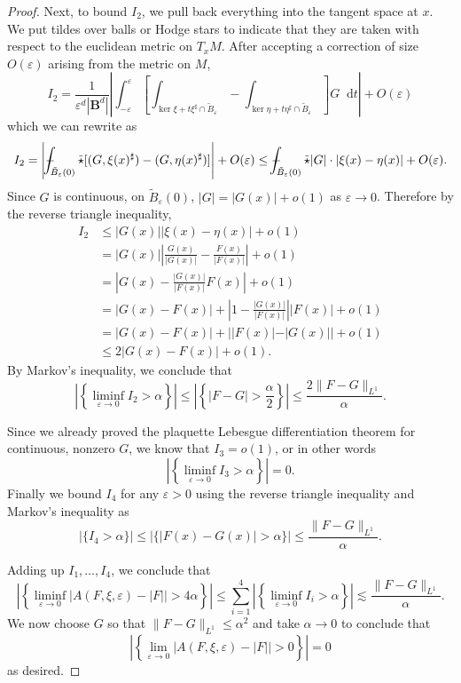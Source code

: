 \documentclass[reqno,11pt]{amsart}
\newcommand{\Ball}{\mathbf{B}}
\newcommand*\dif{\mathop{}\!\mathrm{d}}
\theoremstyle{definition}
\numberwithin{equation}{section}
\def\Xint#1{\mathchoice
{\XXint\displaystyle\textstyle{#1}}%
{\XXint\textstyle\scriptstyle{#1}}%
{\XXint\scriptstyle\scriptscriptstyle{#1}}%
{\XXint\scriptscriptstyle\scriptscriptstyle{#1}}%
\!\int}
\def\XXint#1#2#3{{\setbox0=\hbox{$#1{#2#3}{\int}$ }
\vcenter{\hbox{$#2#3$ }}\kern-.6\wd0}}
\def\dashint{\Xint-}
\begin{document}
\begin{proof}
Next, to bound $I_2$, we pull back everything into the tangent space at $x$.
We put tildes over balls or Hodge stars to indicate that they are taken with respect to the euclidean metric on $T_x M$.
After accepting a correction of size $O(\varepsilon)$ arising from the metric on $M$, 
$$I_2 = \frac{1}{\varepsilon^d |\Ball^d|} \left|\int_{-\varepsilon}^\varepsilon \left[\int_{\ker \xi + t\xi^\sharp \cap \tilde B_\varepsilon} - \int_{\ker \eta + t\eta^\sharp \cap \tilde B_\varepsilon}\right] G \dif t\right| + O(\varepsilon)$$
which we can rewrite as
$$I_2 = \left|\dashint_{\tilde B_\varepsilon(0)} \tilde \star [(G, \xi(x)^\sharp) - (G, \eta(x)^\sharp)]\right| + O(\varepsilon) \leq \dashint_{\tilde B_\varepsilon(0)} \tilde \star |G| \cdot |\xi(x) - \eta(x)| + O(\varepsilon).$$
Since $G$ is continuous, on $\tilde B_\varepsilon(0)$, $|G| = |G(x)| + o(1)$ as $\varepsilon \to 0$.
Therefore by the reverse triangle inequality,
\begin{align*}
I_2
&\leq |G(x)| |\xi(x) - \eta(x)| + o(1) \\
&= |G(x)| \left|\frac{G(x)}{|G(x)|} - \frac{F(x)}{|F(x)|}\right| + o(1) \\
&= \left|G(x) - \frac{|G(x)|}{|F(x)|} F(x)\right| + o(1) \\
&= |G(x) - F(x)| + \left|1 - \frac{|G(x)|}{|F(x)|}\right| |F(x)| + o(1)\\
&= |G(x) - F(x)| + ||F(x)| - |G(x)|| + o(1) \\
&\leq 2|G(x) - F(x)| + o(1).
\end{align*}
By Markov's inequality, we conclude that 
$$\left|\left\{\liminf_{\varepsilon \to 0} I_2 > \alpha\right\}\right| \leq \left|\left\{|F - G| > \frac{\alpha}{2}\right\}\right| \leq \frac{2\|F - G\|_{L^1}}{\alpha}.$$

Since we already proved the plaquette Lebesgue differentiation theorem for continuous, nonzero $G$, we know that $I_3 = o(1)$, or in other words 
$$\left|\left\{\liminf_{\varepsilon \to 0} I_3 > \alpha\right\}\right| = 0.$$
Finally we bound $I_4$ for any $\varepsilon > 0$ using the reverse triangle inequality and Markov's inequality as 
$$|\{I_4 > \alpha\}| \leq |\{|F(x) - G(x)| > \alpha\}| \leq \frac{\|F - G\|_{L^1}}{\alpha}.$$

Adding up $I_1, \dots, I_4$, we conclude that 
$$\left|\left\{\liminf_{\varepsilon \to 0} |A(F, \xi, \varepsilon) - |F|| > 4\alpha\right\}\right| \leq \sum_{i=1}^4 \left|\left\{\liminf_{\varepsilon \to 0} I_i > \alpha\right\}\right| \lesssim \frac{\|F - G\|_{L^1}}{\alpha}.$$
We now choose $G$ so that $\|F - G\|_{L^1} \leq \alpha^2$ and take $\alpha \to 0$ to conclude that
$$\left|\left\{\lim_{\varepsilon \to 0} |A(F, \xi, \varepsilon) - |F|| > 0\right\}\right| = 0$$
as desired.
\end{proof}
\end{document}
